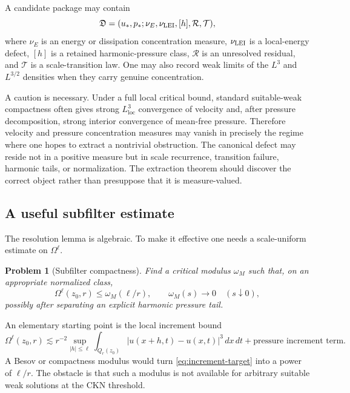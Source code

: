 \documentclass[11pt]{article}
\numberwithin{equation}{section}
\newtheorem{problem}[theorem]{Problem}
\theoremstyle{remark}
\newcommand{\loc}{\mathrm{loc}}
\newcommand{\dxdt}{\,dx\,dt}
\newcommand{\calR}{\mathcal R}
\newcommand{\calT}{\mathcal T}
\begin{document}
A candidate package may contain
\begin{equation}\label{eq:candidate-defect-package}
\mathfrak D
=(u_*,p_*;\nu_E,\nu_{\rm LEI},[h],\calR,\calT),
\end{equation}
where $\nu_E$ is an energy or dissipation concentration measure, $\nu_{\rm LEI}$ is a local-energy defect, $[h]$ is a retained harmonic-pressure class, $\calR$ is an unresolved residual, and $\calT$ is a scale-transition law. One may also record weak limits of the $L^3$ and $L^{3/2}$ densities when they carry genuine concentration.

A caution is necessary. Under a full local critical bound, standard suitable-weak compactness often gives strong $L^3_{\loc}$ convergence of velocity and, after pressure decomposition, strong interior convergence of mean-free pressure. Therefore velocity and pressure concentration measures may vanish in precisely the regime where one hopes to extract a nontrivial obstruction. The canonical defect may reside not in a positive measure but in scale recurrence, transition failure, harmonic tails, or normalization. The extraction theorem should discover the correct object rather than presuppose that it is measure-valued.

\subsection{A useful subfilter estimate}

The resolution lemma is algebraic. To make it effective one needs a scale-uniform estimate on $\Omega^\ell$.

\begin{problem}[Subfilter compactness]\label{prob:subfilter}
Find a critical modulus $\omega_M$ such that, on an appropriate normalized class,
\begin{equation}\label{eq:subfilter-target}
\Omega^\ell(z_0,r)
\le
\omega_M(\ell/r),
\qquad
\omega_M(s)\to0\quad(s\downarrow0),
\end{equation}
possibly after separating an explicit harmonic pressure tail.
\end{problem}

An elementary starting point is the local increment bound
\begin{equation}\label{eq:increment-target}
\Omega^\ell(z_0,r)
\lesssim
r^{-2}\sup_{|h|\le\ell}
\int_{Q_r(z_0)}|u(x+h,t)-u(x,t)|^3\dxdt
+\text{pressure increment term}.
\end{equation}
A Besov or compactness modulus would turn \eqref{eq:increment-target} into a power of $\ell/r$. The obstacle is that such a modulus is not available for arbitrary suitable weak solutions at the CKN threshold.
\end{document}
